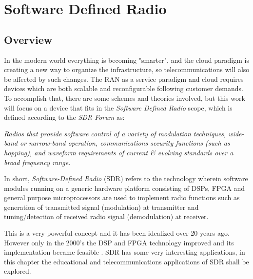 \chapter{Software Defined Radio}
\label{chap:sdr}

\section{Overview}%
\label{sdr:overview}

In the modern world everything is becoming "smarter", and the cloud paradigm is
creating a new way to organize the infrastructure, so telecommunications will
also be affected by such changes. The RAN as a service  paradigm and cloud
requires devices which are both scalable and reconfigurable following customer
demands. To accomplish that, there are some schemes and theories
involved, but this work will focus on a device that fits in the \emph{Software
Defined Radio} scope, which is defined according to the \emph{SDR Forum}
\cite{web:sdrforum} as:\\

\begin{displayquote}
\textit{Radios that provide software control of a variety of modulation techniques,
wide-band or narrow-band operation, communications security functions (such as
hopping), and waveform requirements of current \& evolving standards over a
broad frequency range.}\\
\end{displayquote}

In short, \textit{Software-Defined Radio} (SDR) refers to the technology wherein
software modules running on a generic hardware platform consisting of DSPs, FPGA
and general purpose microprocessors are used to implement radio functions such
as generation of transmitted signal (modulation) at transmitter and
tuning/detection of received radio signal (demodulation) at receiver.

This is a very powerful concept and it has been idealized over 20 years ago.
However only in the 2000's the DSP and FPGA technology improved and
its implementation became feasible \cite{ladimer2009}. SDR has some very
interesting applications, in this chapter the educational and telecommunications
applications of SDR shall be explored.

